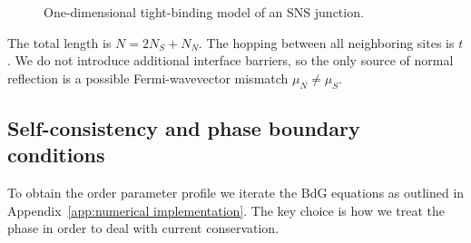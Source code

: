\documentclass[11pt,a4paper,twoside,openany]{report}
\begin{document}
\begin{figure}[H]
\caption{One-dimensional tight-binding model of an SNS junction.}
\label{fig:sns_model}
\end{figure}


The total length is \(N = 2N_S + N_N\).  The hopping between all neighboring sites is \(t\). We do not introduce additional interface barriers, so the only source of normal reflection is a possible Fermi-wavevector mismatch \(\mu_N \neq \mu_S\).

\subsection{Self-consistency and phase boundary conditions}

To obtain the order parameter profile we iterate the BdG equations as outlined in Appendix~\ref{app:numerical implementation}.  The key choice is how we treat the phase in order to deal with current conservation.
\end{document}

